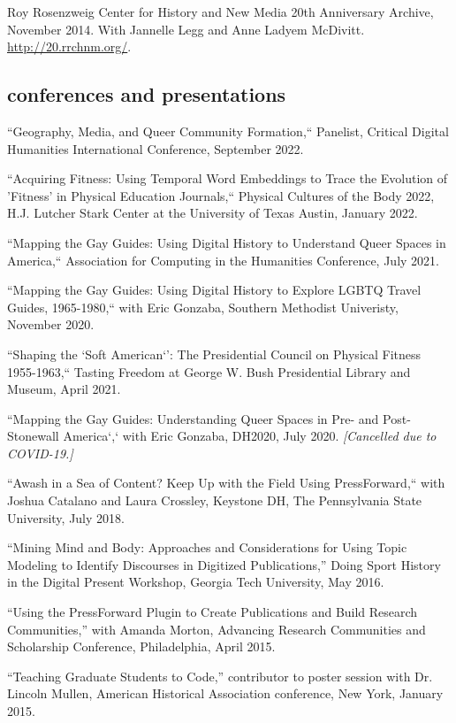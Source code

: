 \documentclass[11pt]{article}
\begin{document}
Roy Rosenzweig Center for History and New Media 20th Anniversary Archive, November 2014. With Jannelle Legg and Anne Ladyem McDivitt. \url{http://20.rrchnm.org/}.


\subsection{conferences and presentations}

``Geography, Media, and Queer Community Formation,`` Panelist, Critical Digital Humanities International Conference, September 2022.

``Acquiring Fitness: Using Temporal Word Embeddings to Trace the Evolution of 'Fitness' in Physical Education Journals,`` Physical Cultures of the Body 2022, H.J. Lutcher Stark Center at the University of Texas Austin, January 2022.

``Mapping the Gay Guides: Using Digital History to Understand Queer Spaces in America,`` Association for Computing in the Humanities Conference, July 2021.

``Mapping the Gay Guides: Using Digital History to Explore LGBTQ Travel Guides, 1965-1980,`` with Eric Gonzaba, Southern Methodist Univeristy, November 2020.

``Shaping the `Soft American`': The Presidential Council on Physical Fitness 1955-1963,`` Tasting Freedom at George W. Bush Presidential Library and Museum, April 2021.

``Mapping the Gay Guides: Understanding Queer Spaces in Pre- and Post-Stonewall America`,` with Eric Gonzaba, DH2020, July 2020. \emph{[Cancelled due to COVID-19.]}

``Awash in a Sea of Content? Keep Up with the Field Using PressForward,`` with Joshua Catalano and Laura Crossley, Keystone DH, The Pennsylvania State University, July 2018.

``Mining Mind and Body: Approaches and Considerations for Using Topic Modeling to Identify Discourses in Digitized Publications,'' Doing Sport History in the Digital Present Workshop, Georgia Tech University, May 2016.

``Using the PressForward Plugin to Create Publications and Build Research Communities,'' with Amanda Morton, Advancing Research Communities and Scholarship Conference, Philadelphia, April 2015.

``Teaching Graduate Students to Code,'' contributor to poster session with Dr. Lincoln Mullen, American Historical Association conference, New York, January 2015.
\end{document}

